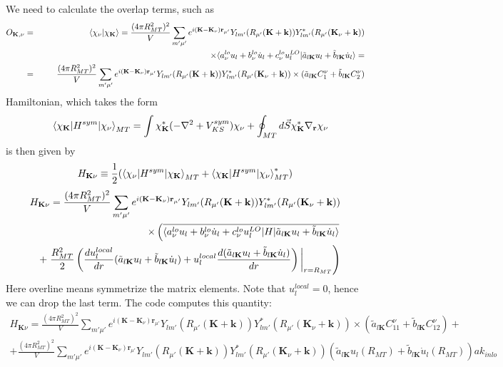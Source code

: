 \documentclass[aps,prb,floatfix,epsfig,singlecolumn,showpacs,preprintnumbers]{revtex4}
\renewcommand{\vr}{{\mathbf{r}}}
\newcommand{\vk}{{\mathbf{k}}}
\newcommand{\vK}{{\mathbf{K}}}
\begin{document}
We need to calculate the overlap terms, such as
\begin{eqnarray}
O_{\vK,\nu} &=&\braket{\chi_\nu|\chi_\vK}=\frac{(4\pi  R_{MT}^2)^2}{V}\sum_{m'\mu'} e^{i(\vK-\vK_\nu)\vr_{\mu'}}
Y_{lm'}(R_{\mu'}(\vK+\vk))  Y^*_{lm'}(R_{\mu'}(\vK_\nu+\vk))\\
&&\qquad\qquad\qquad\qquad\qquad\qquad\qquad\qquad\qquad\qquad \times
{\braket{a^{lo}_{\nu}u_l+b^{lo}_{\nu}\dot{u}_l+c^{lo}_{\nu}u^{LO}_l|\tilde{a}_{l\vK}  u_l+\tilde{b}_{l\vK} \dot{u}_l}}=\\
&=&\frac{(4\pi  R_{MT}^2)^2}{V}\sum_{m'\mu'} e^{i(\vK-\vK_\nu)\vr_{\mu'}}
Y_{lm'}(R_{\mu'}(\vK+\vk))  Y^*_{lm'}(R_{\mu'}(\vK_\nu+\vk))\times (\tilde{a}_{l\vK} C^\nu_1 + \tilde{b}_{l\vK} C^\nu_2)
\end{eqnarray}
Hamiltonian, which takes the form
\begin{eqnarray}
&&\braket{\chi_{\vK}|H^{sym}|\chi_\nu}_{MT}=\int \chi^*_{\vK}(-\nabla^2+V_{KS}^{sym})\chi_{\nu}+\oint_{MT} d\vec{S}\chi^*_{\vK}\nabla_\vr\chi_{\nu}
\end{eqnarray}
 is then given by
$$H_{\vK\nu}\equiv \frac{1}{2}(\braket{\chi_{\nu}|H^{sym}|\chi_\vK}_{MT}+\braket{\chi_{\vK}|H^{sym}|\chi_\nu}^*_{MT}) $$
\begin{eqnarray}
H_{\vK\nu}=
\frac{(4\pi  R_{MT}^2)^2}{V}\sum_{m'\mu'} e^{i(\vK-\vK_\nu)\vr_{\mu'}}
Y_{lm'}(R_{\mu'}(\vK+\vk)) Y^*_{lm'}(R_{\mu'}(\vK_\nu+\vk))  
\\
\times
\left(\overline{\braket{a^{lo}_{\nu}u_l+b^{lo}_{\nu}\dot{u}_l+c^{lo}_{\nu}u^{LO}_l|H|\tilde{a}_{l\vK}  u_l+\tilde{b}_{l\vK} \dot{u}_l}}
\right.
\\
+\left.
\frac{R_{MT}^2}{2}
\left(
\frac{d u^{local}_l}{dr}
(\tilde{a}_{l\vK}  u_l+\tilde{b}_{l\vK} \dot{u}_l)+
u^{local}_l\frac{d (\tilde{a}_{l\vK}  u_l+\tilde{b}_{l\vK} \dot{u}_l)}{dr}
\right)\biggl|_{r=R_{MT}}
\right)
\end{eqnarray}
Here overline means symmetrize the matrix elements. 
Note that $u^{local}_l=0$, hence we can drop the last term.
The code computes this quantity:
\begin{eqnarray}
H_{\vK\nu}=\frac{(4\pi  R_{MT}^2)^2}{V}\sum_{m'\mu'} e^{i(\vK-\vK_\nu)\vr_{\mu'}}
Y_{lm'}(R_{\mu'}(\vK+\vk)) Y^*_{lm'}(R_{\mu'}(\vK_\nu+\vk))  
\times(\tilde{a}_{l\vK} C^\nu_{11} + \tilde{b}_{l\vK} C^\nu_{12})+\\
+\frac{(4\pi  R_{MT}^2)^2}{V}\sum_{m'\mu'} e^{i(\vK-\vK_\nu)\vr_{\mu'}}
Y_{lm'}(R_{\mu'}(\vK+\vk)) Y^*_{lm'}(R_{\mu'}(\vK_\nu+\vk))  (\tilde{a}_{l\vK} u_l(R_{MT}) + \tilde{b}_{l\vK} \dot{u}_l(R_{MT})) ak_{inlo}
\end{eqnarray}
\end{document}
